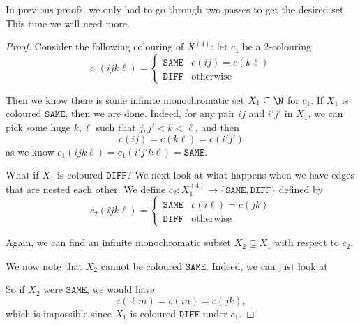 \documentclass[a4paper]{article}
\begin{document}
In previous proofs, we only had to go through two passes to get the desired set. This time we will need more.
\begin{proof}
  Consider the following colouring of $X^{(4)}$: let $c_1$ be a $2$-colouring
  \[
    c_1(ijk\ell) =
    \begin{cases}
      \mathtt{SAME} & c(ij) = c(k\ell)\\
      \mathtt{DIFF} & \mathrm{otherwise}
    \end{cases}
  \]
  \begin{center}
  \end{center}
  Then we know there is some infinite monochromatic set $X_1 \subseteq \N$ for $c_1$. If $X_1$ is coloured $\mathtt{SAME}$, then we are done. Indeed, for any pair $ij$ and $i'j'$ in $X_1$, we can pick some huge $k, \ell$ such that $j, j' < k < \ell$, and then
  \[
    c(ij) = c(k\ell) = c(i'j')
  \]
  as we know $c_1(ijk\ell) = c_1(i'j'k\ell) = \mathtt{SAME}$.

  What if $X_1$ is coloured $\mathtt{DIFF}$? We next look at what happens when we have edges that are nested each other. We define $c_2: X_1^{(4)} \to \{\mathtt{SAME}, \mathtt{DIFF}\}$ defined by
  \[
    c_2(ijk\ell) =
    \begin{cases}
      \mathtt{SAME} & c(i\ell) = c(jk)\\
      \mathtt{DIFF} & \mathrm{otherwise}
    \end{cases}
  \]
  \begin{center}
  \end{center}
  Again, we can find an infinite monochromatic subset $X_2 \subseteq X_1$ with respect to $c_2$.

  We now note that $X_2$ cannot be coloured $\mathtt{SAME}$. Indeed, we can just look at
  \begin{center}
  \end{center}
  So if $X_2$ were $\mathtt{SAME}$, we would have
  \[
    c(\ell m) = c(in) = c(jk),
  \]
  which is impossible since $X_1$ is coloured $\mathtt{DIFF}$ under $c_1$.


\end{proof}
\end{document}
